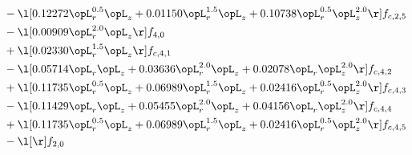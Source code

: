 \begin{alignat}{2}
& - \l[  0.12272 \opL_r^{0.5} \opL_z +  0.01150 \opL_r^{1.5} \opL_z +  0.10738 \opL_r^{0.5} \opL_z^{2.0}  \r] f_{c,2,5} \nonumber \\ 
& - \l[  0.00909 \opL_r^{2.0} \opL_z  \r] f_{4,0} \nonumber \\ 
& + \l[  0.02330 \opL_r^{1.5} \opL_z  \r] f_{c,4,1} \nonumber \\ 
& - \l[  0.05714 \opL_r \opL_z +  0.03636 \opL_r^{2.0} \opL_z +  0.02078 \opL_r \opL_z^{2.0}  \r] f_{c,4,2} \nonumber \\ 
& + \l[  0.11735 \opL_r^{0.5} \opL_z +  0.06989 \opL_r^{1.5} \opL_z +  0.02416 \opL_r^{0.5} \opL_z^{2.0}  \r] f_{c,4,3} \nonumber \\ 
& - \l[  0.11429 \opL_r \opL_z +  0.05455 \opL_r^{2.0} \opL_z +  0.04156 \opL_r \opL_z^{2.0}  \r] f_{c,4,4} \nonumber \\ 
& + \l[  0.11735 \opL_r^{0.5} \opL_z +  0.06989 \opL_r^{1.5} \opL_z +  0.02416 \opL_r^{0.5} \opL_z^{2.0}  \r] f_{c,4,5} \nonumber \\ 
& - \l[  \r] f_{2,0} \nonumber \\ 
\end{alignat} 


